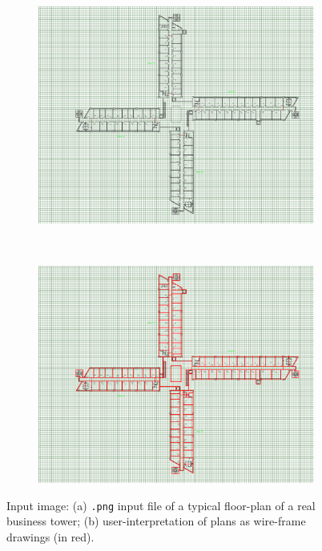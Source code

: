 \documentclass[]{egpubl}
\begin{document}
\begin{figure}[!h]
  \centering
  \begin{subfigure}[b]{0.485\linewidth}
  \includegraphics[width=\textwidth]{images/input-png}
  \caption{}
  \label{fig:input-png:a}
  \end{subfigure}
 ~
  \begin{subfigure}[b]{0.485\linewidth}
  \includegraphics[width=\textwidth]{images/input-png2}
  \caption{}
  \label{fig:input-png:b}
  \end{subfigure}
 
  \caption{Input image: (a) \texttt{.png} input file of a typical floor-plan of a real business tower; (b) user-interpretation of plans as wire-frame drawings (in red).}
  \label{fig:input-png}
 \end{figure}
\end{document}
